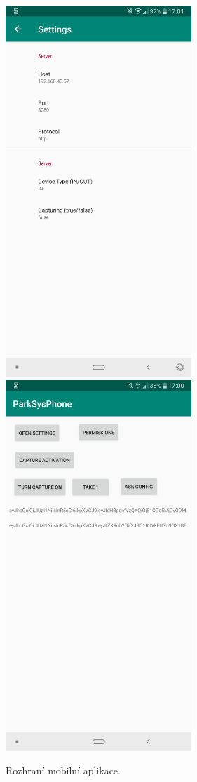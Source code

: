 \begin{figure}[!htb] \centering
  \includegraphics[width=70mm]{../img/app_settings.png}
  \includegraphics[width=70mm]{../img/app_mainscreen.png}
  \caption{Rozhraní mobilní aplikace.}
  \label{fig:app_ui}
\end{figure}

